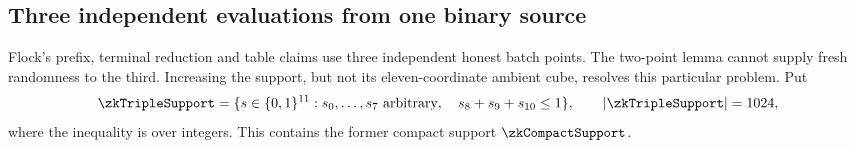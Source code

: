 \subsection{Three independent evaluations from one binary source}\label{note:zk-three-point-span}

Flock's prefix, terminal reduction and table claims use three independent honest batch points. The two-point lemma cannot supply fresh randomness to the third. Increasing the support, but not its eleven-coordinate ambient cube, resolves this particular problem. Put
\[
 \zkTripleSupport=\{s\in\cube{11}:s_0,\ldots,s_7\text{ arbitrary},\quad s_8+s_9+s_{10}\le1\},
 \qquad |\zkTripleSupport|=1024,
\]
where the inequality is over integers. This contains the former compact support $\zkCompactSupport$.

